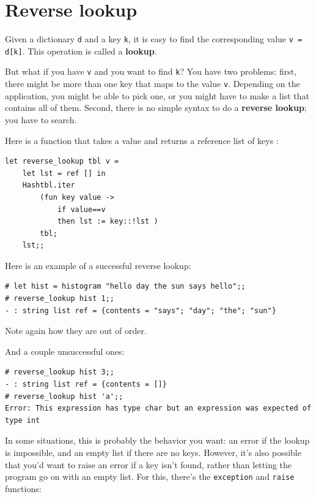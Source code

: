 \documentclass[10pt]{book}
\begin{document}
\section{Reverse lookup}


Given a dictionary {\tt d} and a key {\tt k}, it is easy to
find the corresponding value {\tt v = d[k]}.  This operation
is called a {\bf lookup}.

But what if you have {\tt v} and you want to find {\tt k}?
You have two problems: first, there might be more than one
key that maps to the value {\tt v}.  Depending on the application,
you might be able to pick one, or you might have to make
a list that contains all of them.  Second, there is no
simple syntax to do a {\bf reverse lookup}; you have to search.

Here is a function that takes a value and returns a reference list of 
keys :

\beforeverb
\begin{verbatim}
let reverse_lookup tbl v = 
	let lst = ref [] in
	Hashtbl.iter
		(fun key value ->
			if value==v
			then lst := key::!lst )
		tbl;
	lst;;
\end{verbatim}
\afterverb



Here is an example of a successful reverse lookup:

\beforeverb
\begin{verbatim}
# let hist = histogram "hello day the sun says hello";;
# reverse_lookup hist 1;;
- : string list ref = {contents = "says"; "day"; "the"; "sun"}
\end{verbatim}
\afterverb
%
Note again how they are out of order.

And a couple unsuccessful ones:

\beforeverb
\begin{verbatim}
# reverse_lookup hist 3;;
- : string list ref = {contents = []}
# reverse_lookup hist 'a';;
Error: This expression has type char but an expression was expected of type int
\end{verbatim}
\afterverb
%
In some situations, this is probably the behavior you want: an error if the lookup is impossible, and an empty list if there are no keys. However, it's also possible that you'd want to raise an error if a key isn't found, rather than letting the program go on with an empty list. For this, there's the {\tt exception} and {\tt raise} functions:
\end{document}
